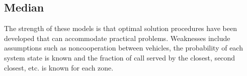 \subsection{Median}
The strength of these models
is that optimal solution procedures
have been developed
that can accommodate practical problems.
Weaknesses include assumptions
such as noncooperation between vehicles,
the probability of each system state is known
and the fraction of call
served by the closest, second closest, etc.
is known for each zone.
